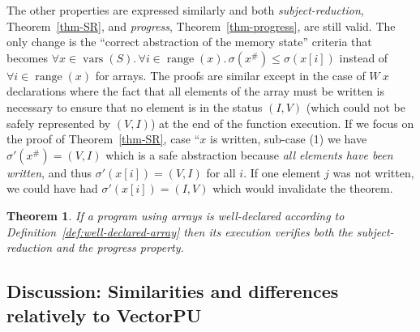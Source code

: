\documentclass[preprint,12pt]{elsarticle}
\DeclareMathOperator{\vars}{vars}
\newtheorem{Theorem}{Theorem}
\newcommand{\abs}[1]{#1^\#}
\DeclareMathOperator{\range}{range}
\begin{document}
The other properties are expressed similarly and both \emph{subject-reduction}, 
Theorem~\ref{thm-SR}, and \emph{progress}, Theorem~\ref{thm-progress}, are 
still valid. The only change is the ``correct abstraction of the memory state'' criteria 
that becomes $\forall x\in 
\vars(S).\,\forall i\in\range(x).\, \sigma(\abs x)\leq\sigma(x[i])$ instead of $\forall 
i\in\range(x)$ for arrays. The proofs are similar except in the case of $W~x$ 
declarations where the fact that all elements of the array must be written is necessary 
to ensure that no element is in the status $(I,V)$ (which could not be safely represented 
by $(V,I)$) at the end of the function execution. If we focus on the proof of 
Theorem~\ref{thm-SR}, case ``$x$ is written, sub-case (1) we have $\sigma'(\abs x)=(V,I)$ 
which is a safe abstraction because \emph{all elements have been written}, and thus 
$\sigma'(x[i])=(V,I)$ for all $i$. If one element $j$ was not written, we could have had 
$\sigma'(x[i])=(I,V)$ which would invalidate the theorem.
%
%
\begin{Theorem}
If a program using arrays is well-declared according to Definition~\ref{def:well-declared-array} then its execution verifies both the subject-reduction and the progress property.
\end{Theorem}
\subsection{Discussion: Similarities and differences relatively to VectorPU}
\end{document}
